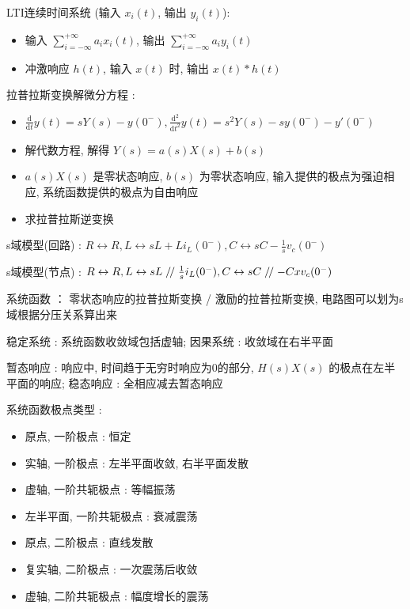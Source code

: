 \documentclass[UTF8, 12pt]{ctexart}
\renewcommand\parallel{\mathrel{/\mskip-2.5mu/}} %
\begin{document}
	LTI连续时间系统 (输入 $ x_{i}(t) $, 输出 $ y_{i}(t) $):
	\begin{itemize}[leftmargin = 4em]
		\item 输入 $ \sum_{i=-\infty}^{+\infty}a_{i}x_{i}(t) $, 输出 $ \sum_{i=-\infty}^{+\infty}a_{i}y_{i}(t) $
		\item 冲激响应 $ h(t) $, 输入 $ x(t) $ 时, 输出 $ x(t)*h(t) $ 
	\end{itemize} 

	拉普拉斯变换解微分方程 :
	\begin{itemize}[leftmargin = 4em]
		\item $ \frac{\mathrm{d}}{\mathrm{d}t}y(t) = sY(s) - y(0^{-}), \frac{\mathrm{d}^{2}}{\mathrm{d}t^{2}}y(t) = s^{2}Y(s) - sy(0^{-}) - y'(0^{-}) $
		\item 解代数方程, 解得 $ Y(s) = a(s)X(s) + b(s) $
		\item $ a(s)X(s) $ 是零状态响应, $ b(s) $ 为零状态响应, 输入提供的极点为强迫相应, 系统函数提供的极点为自由响应
		\item 求拉普拉斯逆变换
	\end{itemize}

	s域模型(回路) : $ R \leftrightarrow R, L \leftrightarrow sL + Li_{L}(0^{-}), C \leftrightarrow sC - \frac{1}{s}v_{c}(0^{-}) $

	s域模型(节点) : $ R \leftrightarrow R, L \leftrightarrow sL \parallel \frac{1}{s}i_{L}(0^{-}), C \leftrightarrow sC \parallel -Cxv_{c}(0^{-}) $

	系统函数 ： 零状态响应的拉普拉斯变换 / 激励的拉普拉斯变换, 电路图可以划为s域根据分压关系算出来

	稳定系统 : 系统函数收敛域包括虚轴; 因果系统 : 收敛域在右半平面

	暂态响应 : 响应中, 时间趋于无穷时响应为0的部分, $ H(s)X(s) $ 的极点在左半平面的响应; 稳态响应 : 全相应减去暂态响应

	系统函数极点类型 :
	\begin{itemize}[leftmargin = 4em]
		\item 原点, 一阶极点 : 恒定
		\item 实轴, 一阶极点 : 左半平面收敛, 右半平面发散
		\item 虚轴, 一阶共轭极点 : 等幅振荡
		\item 左半平面, 一阶共轭极点 : 衰减震荡
		\item 原点, 二阶极点 : 直线发散
		\item 复实轴, 二阶极点 : 一次震荡后收敛
		\item 虚轴, 二阶共轭极点 : 幅度增长的震荡 
	\end{itemize}
\end{document}
